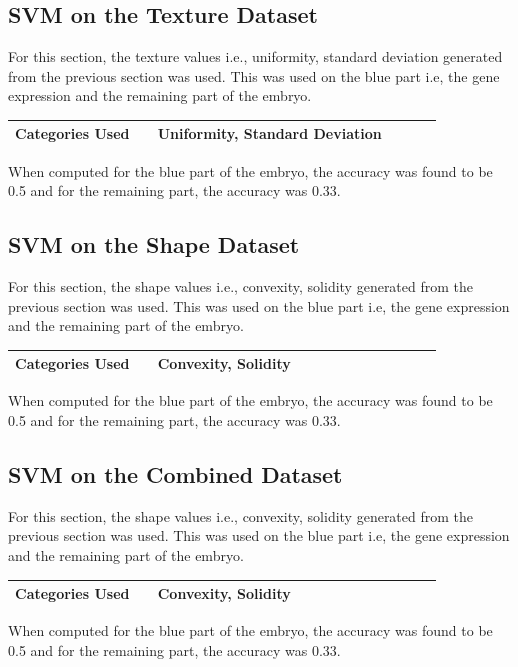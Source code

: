 \documentclass{article}
\begin{document}
\subsection*{SVM on the Texture Dataset}
For this section, the texture values i.e., uniformity, standard deviation generated from the previous section was used. This was used on the blue part i.e, the gene expression and the remaining part of the embryo. 
\begin{table}[h!]
    \centering
    \begin{tabular}{|p{0.3\linewidth} | p{0.6\linewidth}|}
    \hline
       Categories Used &  Uniformity, Standard Deviation \\
    \hline
    \end{tabular}
    \label{tab:SVM_Texture}
\end{table}
When computed for the blue part of the embryo, the accuracy was found to be 0.5 and for the remaining part, the accuracy was 0.33. 
\subsection*{SVM on the Shape Dataset}
For this section, the shape values i.e., convexity, solidity generated from the previous section was used. This was used on the blue part i.e, the gene expression and the remaining part of the embryo. 
\begin{table}[h!]
    \centering
    \begin{tabular}{|p{0.3\linewidth} | p{0.6\linewidth}|}
    \hline
       Categories Used &  Convexity, Solidity \\
    \hline
    \end{tabular}
    \label{tab:Shape}
\end{table}
When computed for the blue part of the embryo, the accuracy was found to be 0.5 and for the remaining part, the accuracy was 0.33. 
\subsection*{SVM on the Combined Dataset}
For this section, the shape values i.e., convexity, solidity generated from the previous section was used. This was used on the blue part i.e, the gene expression and the remaining part of the embryo. 
\begin{table}[h!]
    \centering
    \begin{tabular}{|p{0.3\linewidth} | p{0.6\linewidth}|}
    \hline
       Categories Used &  Convexity, Solidity \\
    \hline
    \end{tabular}
    \label{tab:Shape}
\end{table}
When computed for the blue part of the embryo, the accuracy was found to be 0.5 and for the remaining part, the accuracy was 0.33. 
\end{document}
